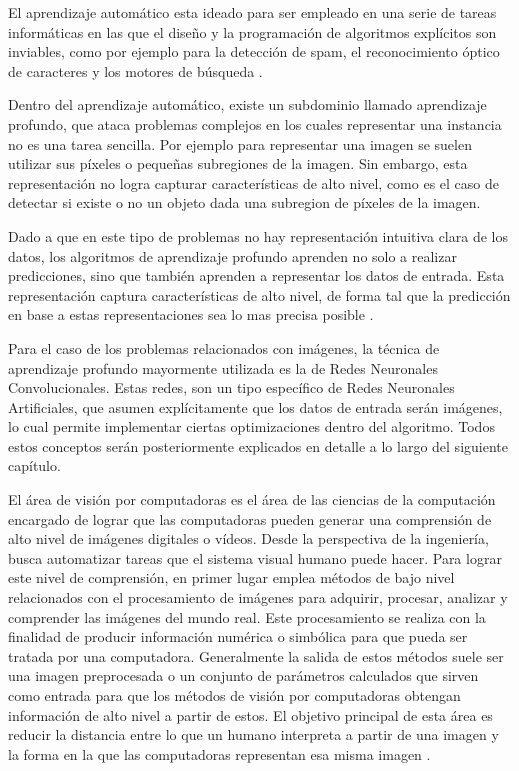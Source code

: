\documentclass[a4paper,11pt,spanish]{book}
\begin{document}
    El aprendizaje automático esta ideado para ser empleado en una serie de tareas informáticas en las que el diseño y la programación de algoritmos explícitos son inviables,
    como por ejemplo para la detección de spam, el reconocimiento óptico de caracteres y los motores de búsqueda \cite{Bishop:MachineLearning}.

    Dentro del aprendizaje automático, existe un subdominio llamado aprendizaje profundo, que ataca problemas complejos en los cuales representar una instancia 
    no es una tarea sencilla.
    Por ejemplo para representar una imagen se suelen utilizar sus píxeles o pequeñas subregiones de la imagen. Sin embargo, esta representación no logra capturar 
    características de alto nivel, como es el caso de detectar si existe o no un objeto dada una subregion de píxeles de la imagen.

    Dado a que en este tipo de problemas no hay representación intuitiva clara de los datos, los algoritmos de aprendizaje profundo aprenden no solo a realizar predicciones, 
    sino que también aprenden a representar los datos de entrada. 
    Esta representación captura características de alto nivel, de forma tal que la predicción en base a estas representaciones sea lo mas precisa posible \cite{Goodfellow-et-al-2016}.

    Para el caso de los problemas relacionados con imágenes, la técnica de aprendizaje profundo mayormente utilizada es la de Redes Neuronales Convolucionales.
    Estas redes, son un tipo específico de Redes Neuronales Artificiales, que asumen explícitamente que los datos de entrada serán imágenes, lo cual permite implementar
    ciertas optimizaciones dentro del algoritmo. Todos estos conceptos serán posteriormente explicados en detalle a lo largo del siguiente capítulo.

    El área de visión por computadoras es el área de las ciencias de la computación encargado de lograr que las computadoras pueden generar una comprensión de alto 
    nivel de imágenes digitales o vídeos.
    Desde la perspectiva de la ingeniería, busca automatizar tareas que el sistema visual humano puede hacer. 
    Para lograr este nivel de comprensión, en primer lugar emplea métodos de bajo nivel relacionados con el procesamiento de imágenes para adquirir, procesar, analizar 
    y comprender las imágenes del mundo real. 
    Este procesamiento se realiza con la finalidad de producir información numérica o simbólica para que pueda ser tratada por una computadora. 
    Generalmente la salida de estos métodos suele ser una imagen preprocesada o un conjunto de parámetros calculados que sirven como entrada
    para que los métodos de visión por computadoras obtengan información de alto nivel a partir de estos.
    El objetivo principal de esta área es reducir la distancia entre lo que un humano interpreta a partir de una imagen y la forma en la que las computadoras 
    representan esa misma imagen \cite{Szeliski:ComputerVision}.
\end{document}
